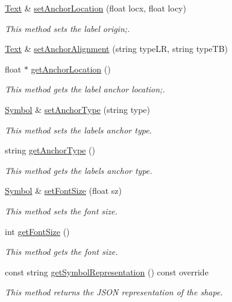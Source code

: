 \begin{DoxyCompactItemize}
\hyperlink{classbridges_1_1datastructure_1_1_text}{Text} \& \hyperlink{classbridges_1_1datastructure_1_1_text_ac7339ebe2bdbcd293c71650fbb0e084d}{set\+Anchor\+Location} (float locx, float locy)
\begin{DoxyCompactList}\small\item\em This method sets the label origin;. \end{DoxyCompactList}\item 
\hyperlink{classbridges_1_1datastructure_1_1_text}{Text} \& \hyperlink{classbridges_1_1datastructure_1_1_text_a9acc48755b386fb4e9200b69b1accc90}{set\+Anchor\+Alignment} (string type\+LR, string type\+TB)
\item 
float $\ast$ \hyperlink{classbridges_1_1datastructure_1_1_text_af3153c5f010f408e11ffde68d1f0bfa4}{get\+Anchor\+Location} ()
\begin{DoxyCompactList}\small\item\em This method gets the label anchor location;. \end{DoxyCompactList}\item 
\hyperlink{classbridges_1_1datastructure_1_1_symbol}{Symbol} \& \hyperlink{classbridges_1_1datastructure_1_1_text_ae0f9d5e7719d8ed7d2883d838572b49f}{set\+Anchor\+Type} (string type)
\begin{DoxyCompactList}\small\item\em This method sets the label\textquotesingle{}s anchor type. \end{DoxyCompactList}\item 
string \hyperlink{classbridges_1_1datastructure_1_1_text_a25aad3b651977113d202e75ab54507fa}{get\+Anchor\+Type} ()
\begin{DoxyCompactList}\small\item\em This method gets the label\textquotesingle{}s anchor type. \end{DoxyCompactList}\item 
\hyperlink{classbridges_1_1datastructure_1_1_symbol}{Symbol} \& \hyperlink{classbridges_1_1datastructure_1_1_text_aead39c229a800902d9c07ab5a07dcd56}{set\+Font\+Size} (float sz)
\begin{DoxyCompactList}\small\item\em This method sets the font size. \end{DoxyCompactList}\item 
int \hyperlink{classbridges_1_1datastructure_1_1_text_a6912ecdb2380f78d6f749638fbf80aa6}{get\+Font\+Size} ()
\begin{DoxyCompactList}\small\item\em This method gets the font size. \end{DoxyCompactList}\item 
const string \hyperlink{classbridges_1_1datastructure_1_1_text_ab326f0cf60addd3027a02fd1f90b6961}{get\+Symbol\+Representation} () const override
\begin{DoxyCompactList}\small\item\em This method returns the J\+S\+ON representation of the shape. \end{DoxyCompactList}\end{DoxyCompactItemize}

